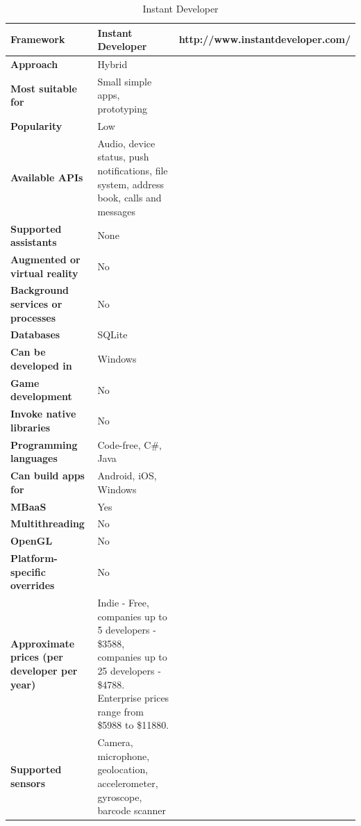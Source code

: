 \documentclass[english,master,public,dept460,male,cpdeclaration,oneside]{diploma}
\begin{document}
\begin{table}[!h]
	\centering
	\caption{Instant Developer}
	\begin{tabular}{p{} | p{} | p{}}
		\toprule		
		\textbf{Framework} & \textbf{Instant Developer} & http://www.instantdeveloper.com/ \\
		\midrule
		\textbf{Approach} & Hybrid & \\			
		\midrule	
		\textbf{Most suitable for} & Small simple apps, prototyping & \\
		\midrule
		\textbf{Popularity} & Low & \\			
		\midrule
		\textbf{Available APIs} & Audio, device status, push notifications, file system, address book, calls and messages & \\			
		\midrule
		\textbf{Supported assistants} & None & \\			
		\midrule
		\textbf{Augmented or virtual reality} & No & \\			
		\midrule
		\textbf{Background services or processes} & No & \\			
		\midrule
		\textbf{Databases} & SQLite & \\			
		\midrule
		\textbf{Can be developed in} & Windows &  \\			
		\midrule
		\textbf{Game development} & No & \\			
		\midrule
		\textbf{Invoke native libraries} & No & \\			
		\midrule
		\textbf{Programming languages} & Code-free, C\#, Java & \\			
		\midrule
		\textbf{Can build apps for} & Android, iOS, Windows & \\			
		\midrule
		\textbf{MBaaS} & Yes & \\			
		\midrule
		\textbf{Multithreading} & No & \\			
		\midrule
		\textbf{OpenGL} & No & \\			
		\midrule
		\textbf{Platform-specific overrides} & No & \\			
		\midrule
		\textbf{Approximate prices (per developer per year)} & Indie - Free, companies up to 5 developers - \$3588, companies up to 25 developers - \$4788. Enterprise prices range from \$5988 to \$11880. & \\			
		\midrule
		\textbf{Supported sensors} & Camera, microphone, geolocation, accelerometer, gyroscope, barcode scanner & \\			
		\midrule
	\end{tabular}
\end{table}
\end{document}
